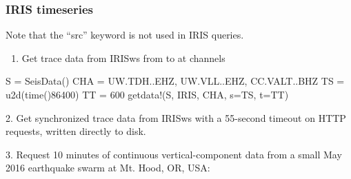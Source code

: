 \documentclass[letterpaper,11pt,english]{sphinxmanual}
\begin{document}
\subsubsection{IRIS timeseries}
\label{\detokenize{src/Appendices/examples:iris-timeseries}}
Note that the “src” keyword is not used in IRIS queries.
\begin{enumerate}
\def\theenumi{\arabic{enumi}}
\def\labelenumi{\theenumi .}
\makeatletter\def\p@enumii{\p@enumi \theenumi .}\makeatother
\item {} 
Get trace data from IRISws from  to  at channels 

\end{enumerate}

\begin{sphinxVerbatim}[commandchars=\\\{\}]
S = SeisData()
CHA = \PYGZdq{}UW.TDH..EHZ, UW.VLL..EHZ, CC.VALT..BHZ\PYGZdq{}
TS = u2d(time()\PYGZhy{}86400)
TT = 600
get\PYGZus{}data!(S, \PYGZdq{}IRIS\PYGZdq{}, CHA, s=TS, t=TT)
\end{sphinxVerbatim}

2. Get synchronized trace data from IRISws with a 55-second timeout on HTTP requests, written directly to disk.

\begin{sphinxVerbatim}[commandchars=\\\{\}]
  
  
  
        
\end{sphinxVerbatim}

3. Request 10 minutes of continuous vertical-component data from a small May 2016 earthquake swarm at Mt. Hood, OR, USA:

\begin{sphinxVerbatim}[commandchars=\\\{\}]
  
     
      
\end{sphinxVerbatim}
\end{document}
